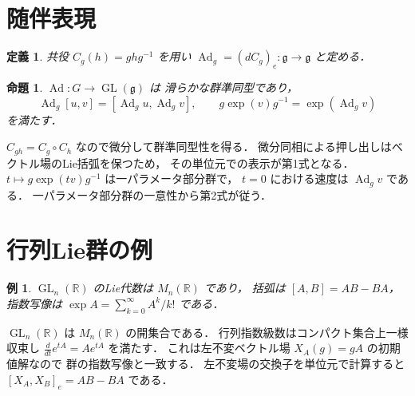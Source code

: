 \documentclass[a5paper,10pt,onecolumn]{jsarticle}
\makeatletter
\theoremstyle{mathnotetheorem}
\newtheorem{definition}[theorem]{定義}
\newtheorem{proposition}[theorem]{命題}
\newtheorem{example}[theorem]{例}
\renewcommand{\proofname}{証明}
\renewenvironment{proof}[1][\proofname]{%
  \par\pushQED{\qed}\normalfont\topsep4\p@\@plus2\p@\relax
  \trivlist\item[\hskip\labelsep\bfseries #1]\ignorespaces
}{\popQED\endtrivlist\@endpefalse}
\makeatother
\begin{document}
\section{随伴表現}
\begin{definition}
共役 $C_g(h)=ghg^{-1}$ を用い
$\operatorname{Ad}_g=(dC_g)_e:\mathfrak g\to\mathfrak g$
と定める．
\end{definition}
\begin{proposition}
$\operatorname{Ad}:G\to\operatorname{GL}(\mathfrak g)$ は
滑らかな群準同型であり，
\[
 \operatorname{Ad}_g[u,v]
 =[\operatorname{Ad}_gu,\operatorname{Ad}_gv],\qquad
 g\exp(v)g^{-1}=\exp(\operatorname{Ad}_gv)
\]
を満たす．
\end{proposition}
\begin{proof}
$C_{gh}=C_g\circ C_h$ なので微分して群準同型性を得る．
微分同相による押し出しはベクトル場のLie括弧を保つため，
その単位元での表示が第1式となる．
$t\mapsto g\exp(tv)g^{-1}$ は一パラメータ部分群で，
$t=0$ における速度は $\operatorname{Ad}_gv$ である．
一パラメータ部分群の一意性から第2式が従う．
\end{proof}
\section{行列Lie群の例}
\begin{example}
$\operatorname{GL}_n(\mathbb R)$ のLie代数は
$M_n(\mathbb R)$ であり，
括弧は $[A,B]=AB-BA$，指数写像は
$\exp A=\sum_{k=0}^\infty A^k/k!$ である．
\end{example}
\begin{proof}
$\operatorname{GL}_n(\mathbb R)$ は
$M_n(\mathbb R)$ の開集合である．
行列指数級数はコンパクト集合上一様収束し
$\frac d{dt}e^{tA}=Ae^{tA}$ を満たす．
これは左不変ベクトル場 $X_A(g)=gA$ の初期値解なので
群の指数写像と一致する．
左不変場の交換子を単位元で計算すると
$[X_A,X_B]_e=AB-BA$ である．
\end{proof}
\end{document}

